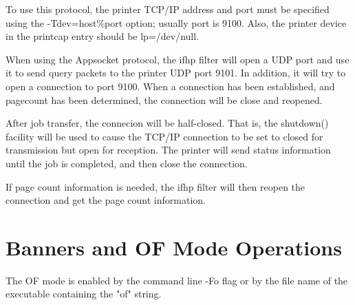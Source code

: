 \documentclass[a4paper]{article}
\begin{document}
To use this protocol,
the printer TCP/IP address and port must be specified using the
{\ttfamily -Tdev=host\%port} option;
usually port is 9100.
Also,
the printer device in the printcap entry should be {\ttfamily lp=/dev/null}.

When using the Appsocket protocol,
the {\ttfamily ifhp} filter will open a UDP port and use it to send
query packets to the printer UDP port 9101.
In addition,
it will try to open a connection to port 9100.
When a connection has been established,
and pagecount has been determined,
the connection will be close and reopened.

After job transfer,
the connecion will be {\ttfamily half-closed}.
That is,
the {\ttfamily shutdown()} facility will be used to cause the TCP/IP connection
to be set to closed for transmission but open for reception.
The printer will send status information until the job is completed,
and then close the connection.

If page count information is needed,
the {\ttfamily ifhp} filter will then reopen the connection and get the page count information.


\section{Banners and OF Mode Operations
\label{banner}
\label{banner_file}
\label{page_width}
\label{page_length}}

The OF mode is enabled by the command line -Fo flag or by
the file name of the executable containing the "of" string.
\end{document}
